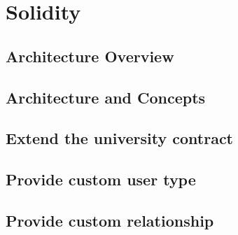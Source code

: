 \documentclass[ManualeSviluppatore.tex]{subfiles}
\begin{document}

\chapter{Solidity}
\section{Architecture Overview}
\section{Architecture and Concepts}
\section{Extend the university contract}
\section{Provide custom user type}
\section{Provide custom relationship}
\end{document}
